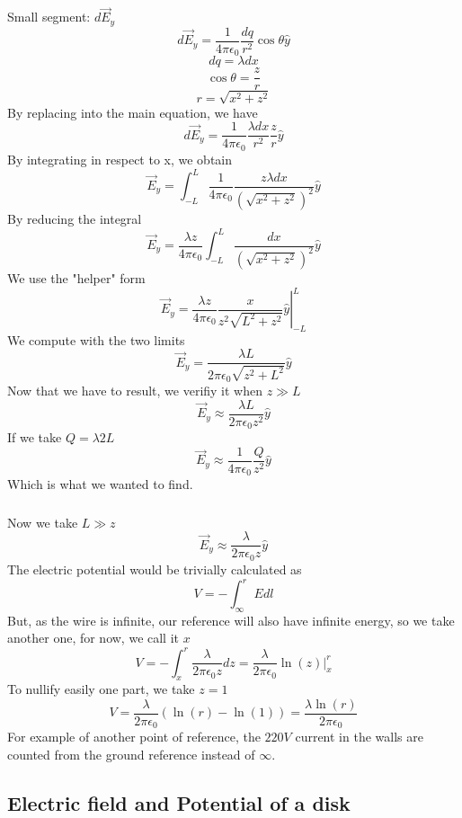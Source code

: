Small segment: \(d\vec{E}_y\)
\[
	d\vec{E}_y =
		\frac{1}{4 \pi \epsilon_0} \frac{dq}{r^2} \cos{\theta} \hat{y}
\]
\[
	dq = \lambda dx
\]
\[
	\cos{\theta} = \frac{z}{r}
\]
\[
	r = \sqrt{x^2+z^2}
\]
By replacing into the main equation, we have
\[
	d\vec{E}_y =
	\frac{1}{4 \pi \epsilon_0} \frac{\lambda dx}{r^2} \frac{z}{r} \hat{y}
\]
By integrating in respect to x, we obtain
\[
	\vec{E}_y =
	\int_{-L}^L \frac{1}{4 \pi \epsilon_0}
	\frac{z \lambda dx}{(\sqrt{x^2+z^2})^2} \hat{y}
\]
By reducing the integral
\[
	\vec{E}_y =
	\frac{\lambda z}{4 \pi \epsilon_0}
	\int_{-L}^L \frac{dx}{(\sqrt{x^2+z^2})^2} \hat{y}
\]
We use the "helper" form
\[
	\vec{E}_y =
	\frac{\lambda z}{4 \pi \epsilon_0}
	\left.\frac{x}{z^2 \sqrt{L^2+z^2}} \hat{y}\right|_{-L}^L
\]
We compute with the two limits
\[
	\vec{E}_y =
	\frac{\lambda L}{2 \pi \epsilon_0 \sqrt{z^2+L^2}} \hat{y}
\]
Now that we have to result, we verifiy it when \(z \gg L\)
\[
	\vec{E}_y \approx
	\frac{\lambda L}{2 \pi \epsilon_0 z^2} \hat{y}
\]
If we take \(Q = \lambda 2 L\)
\[
	\vec{E}_y \approx
	\frac{1}{4 \pi \epsilon_0} \frac{Q}{z^2} \hat{y}
\]
Which is what we wanted to find.

\subsubsection{}
Now we take \(L \gg z\)
\[
	\vec{E}_y \approx
	\frac{\lambda}{2 \pi \epsilon_0 z} \hat{y}
\]
The electric potential would be trivially calculated as
\[
	V = - \int_{\infty}^r E dl
\]
But, as the wire is infinite, our reference will also have infinite energy,
so we take another one, for now, we call it \(x\)
\[
	V = - \int_x^r \frac{\lambda}{2 \pi \epsilon_0 z} dz
	= \frac{\lambda}{2 \pi \epsilon_0} \left. \ln(z) \right |_x^r
\]
To nullify easily one part, we take \(z = 1\)
\[
	V = \frac{\lambda}{2 \pi \epsilon_0} (\ln(r) - \ln(1))
	= \frac{\lambda \ln(r)}{2 \pi \epsilon_0}
\]
For example of another point of reference, the \(220 V\) current in the walls
are counted from the ground reference instead of \(\infty\).

\subsection{Electric field and Potential of a disk}

